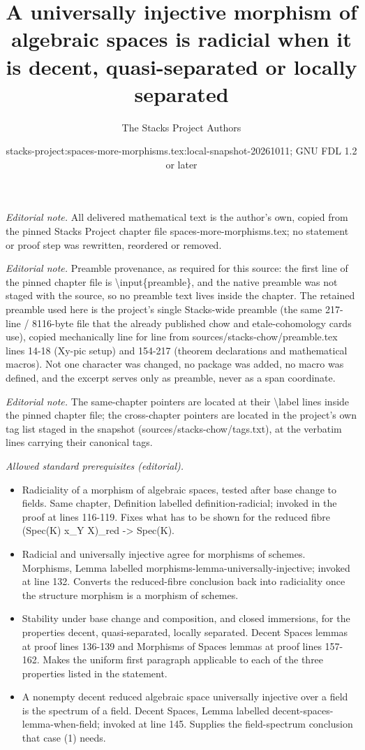\documentclass[10pt,a4paper]{amsart}
\title{A universally injective morphism of algebraic spaces is radicial when it is decent, quasi-separated or locally separated}
\author{The Stacks Project Authors}
\date{stacks-project:spaces-more-morphisms.tex:local-snapshot-20261011; GNU FDL 1.2 or later}
\theoremstyle{plain}
\theoremstyle{definition}
\theoremstyle{remark}
\numberwithin{equation}{subsection}
\begin{document}
\maketitle
\noindent\textit{Editorial note.} All delivered mathematical text is the author's own, copied from the pinned Stacks Project chapter file spaces-more-morphisms.tex; no statement or proof step was rewritten, reordered or removed.\par\medskip
\noindent\textit{Editorial note.} Preamble provenance, as required for this source: the first line of the pinned chapter file is \textbackslash{}input\{preamble\}, and the native preamble was not staged with the source, so no preamble text lives inside the chapter. The retained preamble used here is the project's single Stacks-wide preamble (the same 217-line / 8116-byte file that the already published chow and etale-cohomology cards use), copied mechanically line for line from sources/stacks-chow/preamble.tex lines 14-18 (Xy-pic setup) and 154-217 (theorem declarations and mathematical macros). Not one character was changed, no package was added, no macro was defined, and the excerpt serves only as preamble, never as a span coordinate.\par\medskip
\noindent\textit{Editorial note.} The same-chapter pointers are located at their \textbackslash{}label lines inside the pinned chapter file; the cross-chapter pointers are located in the project's own tag list staged in the snapshot (sources/stacks-chow/tags.txt), at the verbatim lines carrying their canonical tags.\par\medskip
\noindent\textit{Allowed standard prerequisites (editorial).}\begin{itemize}
\item Radiciality of a morphism of algebraic spaces, tested after base change to fields. Same chapter, Definition labelled definition-radicial; invoked in the proof at lines 116-119. Fixes what has to be shown for the reduced fibre (Spec(K) x\_Y X)\_red -> Spec(K).
\item Radicial and universally injective agree for morphisms of schemes. Morphisms, Lemma labelled morphisms-lemma-universally-injective; invoked at line 132. Converts the reduced-fibre conclusion back into radiciality once the structure morphism is a morphism of schemes.
\item Stability under base change and composition, and closed immersions, for the properties decent, quasi-separated, locally separated. Decent Spaces lemmas at proof lines 136-139 and Morphisms of Spaces lemmas at proof lines 157-162. Makes the uniform first paragraph applicable to each of the three properties listed in the statement.
\item A nonempty decent reduced algebraic space universally injective over a field is the spectrum of a field. Decent Spaces, Lemma labelled decent-spaces-lemma-when-field; invoked at line 145. Supplies the field-spectrum conclusion that case (1) needs.
\end{itemize}\medskip
\end{document}
